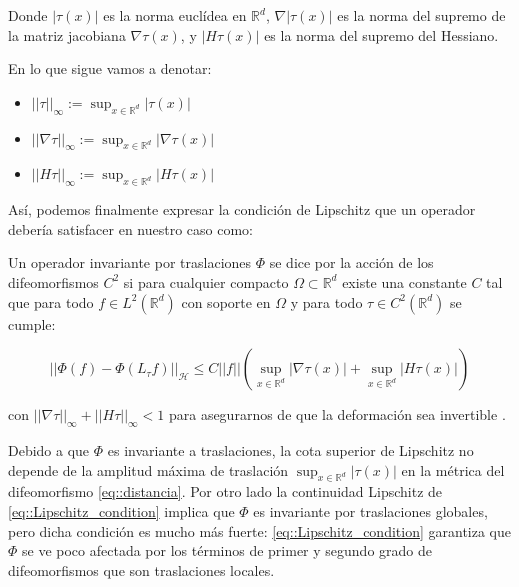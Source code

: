 \noindent Donde $|\tau (x)|$ es la norma euclídea en $\mathbb{R}^d$, $\nabla |\tau (x)|$ es la norma del supremo de la matriz jacobiana $\nabla \tau (x)$, y $|H \tau (x)|$ es la norma del supremo del Hessiano.

\medskip


\noindent En lo que sigue vamos a denotar: 

\begin{itemize}
  \item $|| \tau ||_\infty := \sup_{x \in \mathbb{R}^d} |\tau(x)|$
  \item $||\nabla \tau ||_\infty := \sup_{x \in \mathbb{R}^d} |\nabla \tau(x)|$
  \item $||H \tau ||_\infty := \sup_{x \in \mathbb{R}^d} |H \tau(x)|$ 
\end{itemize}

\medskip

\noindent Así, podemos finalmente expresar la condición de Lipschitz que un operador debería satisfacer en nuestro caso como: 


\medskip

\begin{definicion} \label{def::Lipschitz_cont}
\noindent Un operador invariante por traslaciones $\Phi$ se dice  por la acción de los difeomorfismos $C^2$  si para cualquier compacto $\Omega \subset \mathbb{R}^d$ existe una constante $C$ tal que para todo $f \in L^2(\mathbb{R}^d)$ con soporte en $\Omega$ y para todo $\tau \in C^2(\mathbb{R}^d)$ se cumple:

\begin{equation} \label{eq::Lipschitz_condition}
  || \Phi(f)-\Phi(L_{\tau}f)||_\mathcal{H} \leq C||f||(\sup_{x \in \mathbb{R}^d} |\nabla \tau (x)| + \sup_{x \in \mathbb{R}^d}|H \tau (x)|)
\end{equation}

con  $|| \nabla \tau ||_\infty + ||H \tau ||_\infty < 1$ para asegurarnos de que la deformación sea invertible \cite{doi:10.1137/S0036141002404838}.
\end{definicion}

\medskip

\noindent Debido a que $\Phi$ es invariante a traslaciones, la cota superior de Lipschitz no depende de la amplitud máxima de traslación $\sup_{x \in \mathbb{R}^d}|\tau (x)|$ en la métrica del difeomorfismo \eqref{eq::distancia}. Por otro lado la continuidad Lipschitz de \eqref{eq::Lipschitz_condition} implica que $\Phi$ es invariante por traslaciones globales, pero dicha condición es mucho más fuerte: \eqref{eq::Lipschitz_condition} garantiza que $\Phi$ se ve poco afectada por los términos de primer y segundo grado de difeomorfismos que son traslaciones locales.

